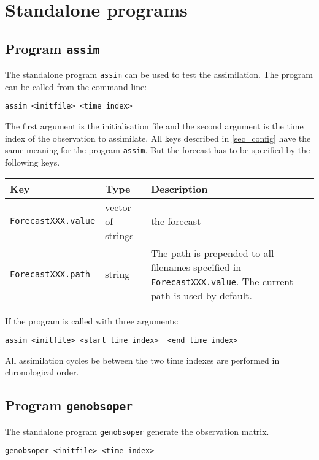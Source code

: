 \documentclass[a4paper,12pt]{article}
\newcommand{\code}{\texttt}
\newenvironment{keytabular}{\begin{tabular}{|p{0.3\textwidth}|p{0.2\textwidth}|p{0.5\textwidth}|} \hline Key & Type & Description \\ \hline \hline }{\end{tabular}}
\begin{document}
\section{Standalone programs}\label{sec_standalone}

\subsection{Program \code{assim}}\label{prog_assim}

The standalone program \code{assim} can be used to test the assimilation. The program can be called from the command line:

\begin{verbatim}
assim <initfile> <time index>
\end{verbatim}

The first argument is the initialisation file and the second argument is the time index of the observation to assimilate. All keys described in \ref{sec_config} have the same meaning for the program \code{assim}. But the forecast has to be specified by the following keys.

\begin{keytabular}
\code{ForecastXXX.value} & vector of strings & the forecast
\\
\code{ForecastXXX.path} & string &  The path is prepended to all filenames
specified in \code{ForecastXXX.value}. The current path is used by default.
\\
\hline
\end{keytabular}

If the program is called with three arguments:

\begin{verbatim}
assim <initfile> <start time index>  <end time index>
\end{verbatim}

All assimilation cycles be between the two time indexes are performed in chronological order.

\subsection{Program \code{genobsoper}}

The standalone program \code{genobsoper} generate the observation matrix.

\begin{verbatim}
genobsoper <initfile> <time index>
\end{verbatim}
\end{document}
